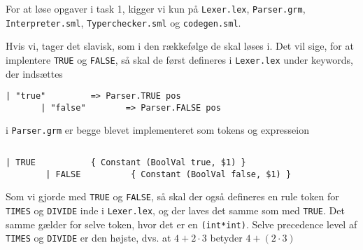 \documentclass[11pt,a4paper,oneside]{report}
\begin{document}

\setcounter{page}{0}
\renewcommand\thepage{\roman{page}}



\tableofcontents

\newpage

\setcounter{page}{1}
\renewcommand\thepage{\arabic{page}}


For at løse opgaver i task 1, kigger vi kun på \texttt{Lexer.lex}, \texttt{Parser.grm}, \texttt{Interpreter.sml}, \texttt{Typerchecker.sml} og \texttt{codegen.sml}.

Hvis vi, tager det slavisk, som i den rækkefølge de skal løses i. Det vil sige, for at implentere \texttt{TRUE} og \texttt{FALSE}, så skal de først defineres i \texttt{Lexer.lex} under keywords, der indsættes
\begin{lstlisting}[firstnumber=42]
       | "true"         => Parser.TRUE pos
       | "false"        => Parser.FALSE pos
\end{lstlisting}
i \texttt{Parser.grm} er begge blevet implementeret som tokens og expresseion
\begin{lstlisting}[firstnumber=13]
%token <(int*int)> TRUE FALSE
\end{lstlisting}
\begin{lstlisting}[mathescape=false,firstnumber=68]
        | TRUE           { Constant (BoolVal true, $1) }
        | FALSE          { Constant (BoolVal false, $1) }
\end{lstlisting}
Som vi gjorde med \texttt{TRUE} og \texttt{FALSE}, så skal der også defineres en rule token for \texttt{TIMES} og \texttt{DIVIDE} inde i \texttt{Lexer.lex}, og der laves det samme som med \texttt{TRUE}. Det samme gælder for selve token, hvor det er en \texttt{(int*int)}. Selve precedence level af \texttt{TIMES} og \texttt{DIVIDE} er den højste, dvs. at $4 + 2 \cdot 3$ betyder $4 + (2 \cdot 3)$





\clearpage
{}


\end{document}
